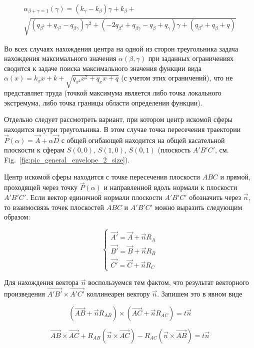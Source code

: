 \documentclass[
11pt,%
tightenlines,%
twoside,%
onecolumn,%
nofloats,%
nobibnotes,%
nofootinbib,%
superscriptaddress,%
noshowpacs,%
centertags]%
{revtex4}
\begin{document}
\begin{multline}
\alpha_{\beta + \gamma = 1}(\gamma) = (k_{\gamma} - k_{\beta}) \gamma + k_{\beta} + \\
\sqrt{(q_{\beta^2} + q_{\gamma^2} - q_{\beta \gamma}) \gamma^2 + (-2 q_{\beta^2} + q_{\beta \gamma} - q_{\beta} + q_{\gamma}) \gamma + (q_{\beta^2} + q_{\beta} + q)}
\end{multline}

Во всех случаях нахождения центра на одной из сторон треугольника задача нахождения максимального значения $\alpha(\beta, \gamma)$ при заданных ограничениях сводится к задаче поиска максимального значения функции вида $\alpha(x) = k_x x + k + \sqrt{q_{x^2} x^2 + q_x x + q}$ (с учетом этих ограничений), что не представляет труда (точкой максимума является либо точка локального экстремума, либо точка границы области определения функции).

Отдельно следует рассмотреть вариант, при котором центр искомой сферы находится внутри треугольника. В этом случае точка пересечения траектории $\vec{P}(\alpha) = \vec{A} + \alpha \vec{D}$ с общей огибающей находится на общей касательной плоскости к сферам $S(0, 0)$, $S(1, 0)$, $S(0, 1)$ (плоскость $A'B'C'$, см. Fig.~\ref{fig:pic_general_envelope_2_size}).

Центр искомой сферы находится с точке пересечения плоскости $ABC$ и прямой, проходящей через точку $\vec{P}(\alpha)$ и направленной вдоль нормали к плоскости $A'B'C'$.
Если вектор единичной нормали плоскости $A'B'C'$ обозначить через $\vec{n}$, то взаимосвязь точек плоскостей $ABC$ и $A'B'C'$ можно выразить следующим образом:

\begin{equation}
\begin{cases}
\vec{A'} = \vec{A} + \vec{n} R_A \\
\vec{B'} = \vec{B} + \vec{n} R_B \\
\vec{C'} = \vec{C} + \vec{n} R_C
\end{cases}
\end{equation}

Для нахождения вектора $\vec{n}$ воспользуемся тем фактом, что результат векторного произведения $\vec{A'B'} \times \vec{A'C'}$ коллинеарен вектору $\vec{n}$.
Запишем это в явном виде

\begin{equation}
(\vec{AB} + \vec{n} R_{AB}) \times (\vec{AC} + \vec{n} R_{AC}) = t \vec{n}
\end{equation}

\begin{equation}
\vec{AB} \times \vec{AC} + R_{AB} (\vec{n} \times \vec{AC}) - R_{AC} (\vec{n} \times \vec{AB}) = t \vec{n}
\end{equation}
\end{document}
